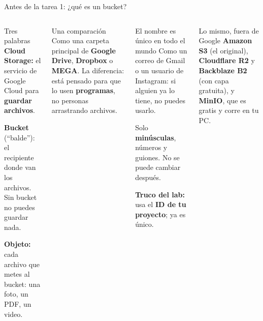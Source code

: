 \documentclass[aspectratio=169,10pt,c]{beamer}
\begin{document}
\begin{frame}{Antes de la tarea 1: ¿qué es un bucket?}
\begin{columns}[T,onlytextwidth]
\begin{block}{Tres palabras}
\small
\textbf{Cloud Storage:} el servicio de Google Cloud para \textbf{guardar archivos}.\par\smallskip
\textbf{Bucket} (``balde''): el recipiente donde van los archivos. Sin bucket no puedes guardar nada.\par\smallskip
\textbf{Objeto:} cada archivo que metes al bucket: una foto, un PDF, un video.
\end{block}
\begin{exampleblock}{Una comparación}
\small Como una carpeta principal de \textbf{Google Drive}, \textbf{Dropbox} o \textbf{MEGA}. La diferencia: está pensado para que lo usen \textbf{programas}, no personas arrastrando archivos.
\end{exampleblock}
\begin{alertblock}{El nombre es único en todo el mundo}
\small Como un correo de Gmail o un usuario de Instagram: si alguien ya lo tiene, no puedes usarlo.\par\smallskip
Solo \textbf{minúsculas}, números y guiones. No se puede cambiar después.\par\smallskip
\textbf{Truco del lab:} usa el \textbf{ID de tu proyecto}; ya es único.
\end{alertblock}
\begin{block}{Lo mismo, fuera de Google}
\small \textbf{Amazon S3} (el original), \textbf{Cloudflare R2} y \textbf{Backblaze B2} (con capa gratuita), y \textbf{MinIO}, que es gratis y corre en tu PC.
\end{block}
\end{columns}
\end{frame}
\end{document}
